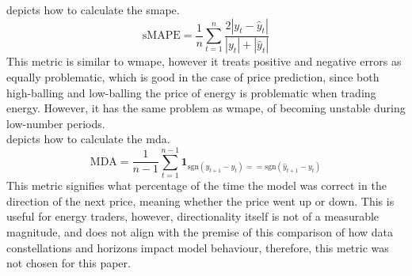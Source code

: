  depicts how to calculate the \gls{smape}. 
\begin{equation}
	\text{sMAPE} = \frac{1}{n} \sum_{t=1}^{n} \frac{2|y_t - \hat{y}_t|}{|y_t| + 
		|\hat{y}_t|}
	\label{eq:smape}
\end{equation}
This metric is similar to \gls{wmape}, however it treats positive and negative 
errors as equally problematic, which is good in the case of price prediction, 
since both high-balling and low-balling the price of energy is problematic when 
trading energy. However, it has the same problem as \gls{wmape}, of becoming 
unstable during low-number periods. \\

 depicts how to calculate the \gls{mda}.
\begin{equation}
	\text{MDA} = \frac{1}{n-1} \sum_{t=1}^{n-1} \mathbf{1}_{\text{sgn}(y_{t+1} 
		- y_t) == \text{sgn}(\hat{y}_{t+1} - y_t)}
	\label{eq:mda}
\end{equation}
This metric signifies what percentage of the time the model was correct in the 
direction of the next price, meaning whether the price went up or down. This is 
useful for energy traders, however, directionality itself is not 
of a measurable magnitude, and does not align with the premise of this 
comparison of how data constellations and horizons impact model behaviour, 
therefore, this metric was not chosen for this paper. 